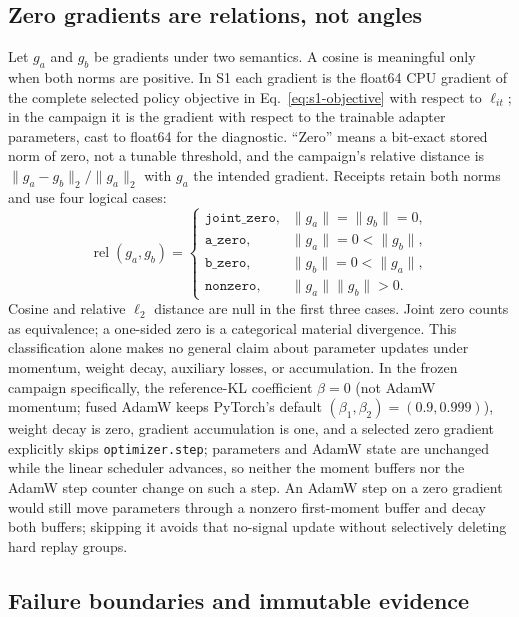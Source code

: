 \documentclass{article}
\begin{document}
\subsection{Zero gradients are relations, not angles}

Let $g_a$ and $g_b$ be gradients under two semantics.  A cosine is meaningful
only when both norms are positive.  In S1 each gradient is the float64 CPU
gradient of the complete selected policy objective in
Eq.~\eqref{eq:s1-objective} with respect to $\ell_{it}$; in the campaign it is
the gradient with respect to the trainable adapter parameters, cast to float64
for the diagnostic.  ``Zero'' means a bit-exact stored norm of zero, not a
tunable threshold, and the campaign's relative distance is
$\lVert g_a-g_b\rVert_2/\lVert g_a\rVert_2$ with $g_a$ the intended gradient.
Receipts retain both norms and use four logical cases:
\begin{equation}
\operatorname{rel}(g_a,g_b)=
\begin{cases}
  \texttt{joint\_zero}, & \lVert g_a\rVert=\lVert g_b\rVert=0,\\
  \texttt{a\_zero}, & \lVert g_a\rVert=0<\lVert g_b\rVert,\\
  \texttt{b\_zero}, & \lVert g_b\rVert=0<\lVert g_a\rVert,\\
  \texttt{nonzero}, & \lVert g_a\rVert\lVert g_b\rVert>0.
\end{cases}
\label{eq:gradient-relation}
\end{equation}
Cosine and relative $\ell_2$ distance are null in the first three cases.
Joint zero counts as equivalence; a one-sided zero is a categorical material
divergence.  This classification alone makes no general claim about parameter
updates under momentum, weight decay, auxiliary losses, or accumulation.  In
the frozen campaign specifically, the reference-KL coefficient $\beta=0$
(not AdamW momentum; fused AdamW keeps PyTorch's default
$(\beta_1,\beta_2)=(0.9,0.999)$), weight decay is zero, gradient
accumulation is one, and a selected zero gradient explicitly skips
\texttt{optimizer.step}; parameters and AdamW state are unchanged while the
linear scheduler advances, so neither the moment buffers nor the AdamW step
counter change on such a step.  An AdamW step on a zero gradient would still
move parameters through a nonzero first-moment buffer and decay both buffers;
skipping it avoids that no-signal update without selectively deleting hard
replay groups.

\subsection{Failure boundaries and immutable evidence}
\end{document}
